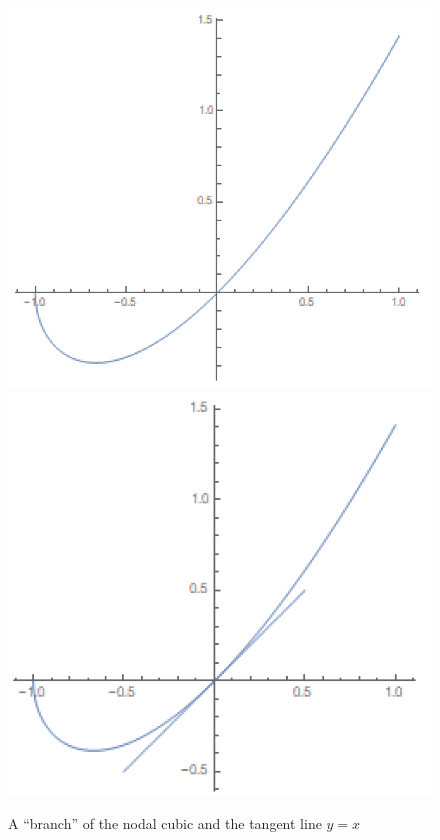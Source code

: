 \documentclass[12pt]{article}
\begin{document}
\begin{figure}[!htb]
	\centering
	\includegraphics[scale=0.7]{ag1}
	\includegraphics[scale=0.7]{ag2}
	\caption{A ``branch'' of the nodal cubic and the tangent line $y=x$}
\end{figure}
\end{document}
